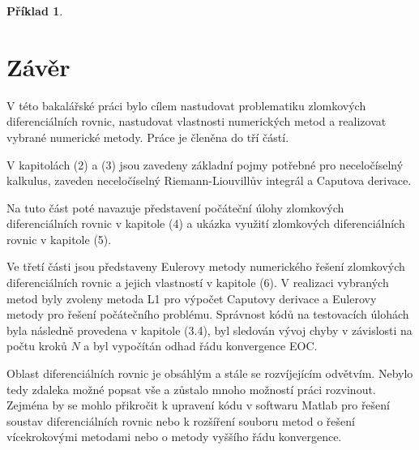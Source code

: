 \documentclass[a4paper,12pt,twoside]{article}
\theoremstyle{definition}
\newtheorem{prikl}[veta]{Příklad}
\theoremstyle{remark}
\numberwithin{equation}{section}
\numberwithin{table}{section}
\numberwithin{figure}{section}
\begin{document}
\begin{prikl}
\begin{table}[h!]
	\end{table}
\end{prikl}

\newpage
\section{Závěr}
V této bakalářské práci bylo cílem nastudovat problematiku zlomkových diferenciálních rovnic, nastudovat vlastnosti numerických metod a realizovat vybrané numerické metody. Práce je členěna do tří částí. 

V kapitolách (2) a (3) jsou zavedeny základní pojmy potřebné pro neceločíselný kalkulus, zaveden neceločíselný  Riemann-Liouvillův integrál a Caputova derivace. 

Na tuto část poté navazuje představení počáteční úlohy zlomkových diferenciálních rovnic v kapitole (4) a ukázka využití zlomkových diferenciálních rovnic v kapitole (5). 

Ve třetí části jsou představeny Eulerovy metody numerického řešení zlomkových diferenciálních rovnic a jejich vlastností v kapitole (6). V realizaci vybraných metod byly zvoleny metoda L1 pro výpočet Caputovy derivace a Eulerovy metody pro řešení počátečního problému. Správnost kódů na testovacích úlohách byla následně provedena v kapitole (3.4), byl sledován vývoj chyby v závislosti na počtu kroků $N$ a byl vypočítán odhad řádu konvergence EOC.

Oblast diferenciálních rovnic je obsáhlým a stále se rozvíjejícím odvětvím. Nebylo tedy zdaleka možné popsat vše a zůstalo mnoho možností práci rozvinout. Zejména by se mohlo přikročit k upravení kódu v softwaru Matlab pro řešení soustav diferenciálních rovnic nebo k rozšíření souboru metod o řešení vícekrokovými metodami nebo o metody vyššího řádu konvergence.
\end{document}
